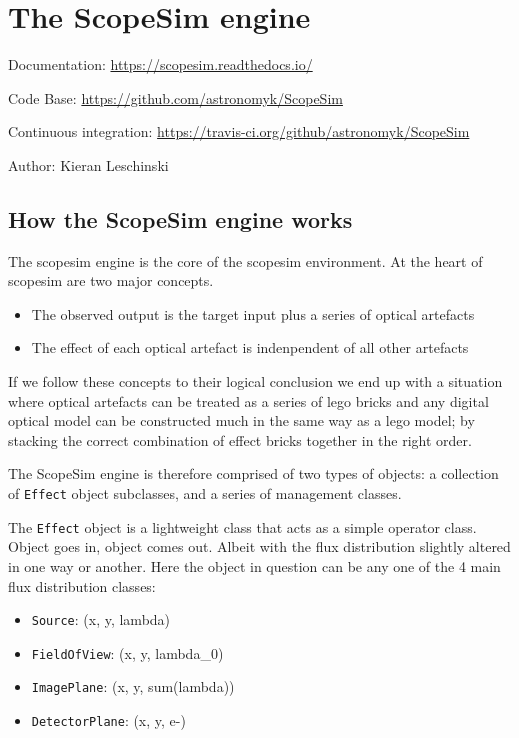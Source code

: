 

\section{The ScopeSim engine%
  \label{the-scopesim-engine}%
}

Documentation: \url{https://scopesim.readthedocs.io/}

Code Base: \url{https://github.com/astronomyk/ScopeSim}

Continuous integration: \url{https://travis-ci.org/github/astronomyk/ScopeSim}

Author: Kieran Leschinski


\subsection{How the ScopeSim engine works%
  \label{how-the-scopesim-engine-works}%
}

The scopesim engine is the core of the scopesim environment.
At the heart of scopesim are two major concepts.

\begin{itemize}
\item The observed output is the target input plus a series of optical artefacts

\item The effect of each optical artefact is indenpendent of all other artefacts
\end{itemize}

If we follow these concepts to their logical conclusion we end up with a situation where optical artefacts can be treated as a series of \textquotedbl{}lego bricks\textquotedbl{} and any digital optical model can be constructed much in the same way as a lego model; by stacking the correct combination of effect \textquotedbl{}bricks\textquotedbl{} together in the right order.

The ScopeSim engine is therefore comprised of two types of objects: a collection of \texttt{Effect} object subclasses, and a series of \textquotedbl{}management\textquotedbl{} classes.

The \texttt{Effect} object is a lightweight class that acts as a simple operator class.
Object goes in, object comes out.
Albeit with the flux distribution slightly altered in one way or another.
Here the object in question can be any one of the 4 main flux distribution classes:

\begin{itemize}
\item \texttt{Source}: (x, y, lambda)

\item \texttt{FieldOfView}: (x, y, lambda\_0)

\item \texttt{ImagePlane}: (x, y, sum(lambda))

\item \texttt{DetectorPlane}: (x, y, e-)
\end{itemize}

